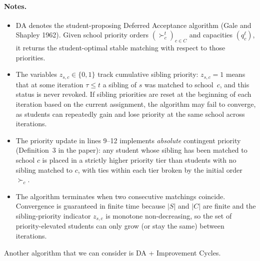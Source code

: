 \documentclass[12pt]{article}
\begin{document}
\paragraph{Notes.}
\begin{itemize}
    \item $\mathrm{DA}$ denotes the student-proposing Deferred Acceptance
          algorithm (Gale and Shapley 1962). Given school priority orders
          $(\succ_c^t)_{c\in C}$ and capacities $(q_c^\ell)$, it returns the
          student-optimal stable matching with respect to those priorities.
    \item The variables $z_{s,c}\in\{0,1\}$ track cumulative sibling
          priority: $z_{s,c}=1$ means that at some iteration $\tau\leq t$ a sibling
          of $s$ was matched to school~$c$, and this status is never revoked. If sibling priorities are reset at the beginning of each iteration based on the current assignment, the algorithm may fail to converge, as students can repeatedly gain and lose priority at the same school across iterations.
    \item The priority update in lines 9--12 implements \emph{absolute}
          contingent priority (Definition~3 in the paper): any student whose sibling
          has been matched to school $c$ is placed in a strictly higher priority tier
          than students with no sibling matched to $c$, with ties within each tier
          broken by the initial order~$\succ_c$.
    \item The algorithm terminates when two consecutive matchings coincide.
          Convergence is guaranteed in finite time because $|S|$ and $|C|$ are finite
          and the sibling-priority indicator $z_{s,c}$ is monotone
          non-decreasing, so the set of priority-elevated students can only grow (or
          stay the same) between iterations.
\end{itemize}


Another algorithm that we can consider is DA + Improvement Cycles.
\end{document}
